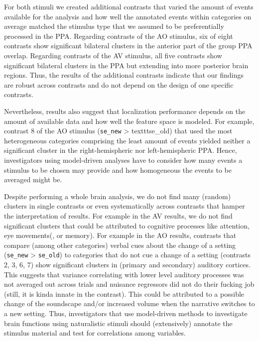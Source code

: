 \documentclass[english]{article}
\begin{document}
For both stimuli we created additional contrasts that varied the amount of
events available for the analysis and how well the annotated events within
categories on average matched the stimulus type that we assumed to be
preferentially processed in the PPA.
Regarding contrasts of the AO stimulus, six of eight contrasts show significant
bilateral clusters in the anterior part of the group PPA overlap.
Regarding contrasts of the AV stimulus, all five contrasts show significant
bilateral clusters in the PPA but extending into more posterior brain regions.
Thus, the results of the additional contrasts indicate that our findings are
robust across contrasts and do not depend on the design of one specific
contrasts.

Nevertheless, results also suggest that localization performance depends on the
amount of available data and how well the feature space is modeled.
For example, contrast 8 of the AO stimulus (\texttt{se\_new} > texttt{se\_old})
that used the most heterogeneous categories comprising the least amount of
events yielded neither a significant cluster in the right-hemispheric nor
left-hemispheric PPA.
Hence, investigators using model-driven analyses have to consider how many
events a stimulus to be chosen may provide and how homogeneous the events to be
averaged might be.

Despite performing a whole brain analysis, we do not find many (random) clusters
in single contrasts or even systematically across contrasts that hamper the
interpretation of results.
For example in the AV results, we do not find significant clusters that could be
attributed to cognitive processes like attention, eye movements(, or
memory).
For example in the AO results, contrasts that compare (among other categories)
verbal cues about the change of a setting (\texttt{se\_new} > \texttt{se\_old})
to categories that do not cue a change of a setting (contrasts 2, 3, 6, 7) show
significant clusters in (primary and secondary) auditory cortices.
This suggests that variance correlating with lower level auditory processes was
not averaged out across trials and nuisance regressors did not do their fucking
job (still, it is kinda innate in the contrast).
This could be attributed to a possible change of the soundscape and/or increased
volume when the narrative switches to a new setting.
Thus, investigators that use model-driven methods to investigate brain functions
using naturalistic stimuli should (extensively) annotate the stimulus material
and test for correlations among variables.
\end{document}
